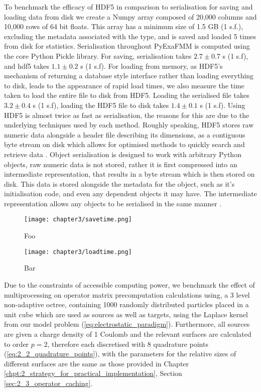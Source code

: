 To benchmark the efficacy of HDF5 in comparison to serialisation for saving
and loading data from disk we create a Numpy array composed of
20,000 columns and 10,000 rows of 64 bit floats. This array has a minimum size
of 1.5 GB (1 s.f.), excluding the metadata associated with the type, and is
saved and loaded 5 times from disk for statistics. Serialisation throughout
\gls{PyExaFMM} is computed using the core Python Pickle library. For saving,
serialisation takes $2.7 \pm 0.7$ s (1 s.f), and hdf5 takes $1.1 \pm 0.2$ s (1 s.f).
For loading from memory, as HDF5's mechanism of returning a database style interface
rather than loading everything to disk, leads to the appearance of rapid
load times, we also measure the time taken to load the entire file to disk from
HDF5. Loading the serialised file takes $3.2 \pm 0.4$ s (1 s.f), loading
the HDF5 file to disk takes $1.4 \pm 0.1$ s (1 s.f). Using HDF5 is almost
twice as fast as serialisation, the reasons for this are due to the underlying
techniques used by each method. Roughly speaking, HDF5 stores raw numeric data
alongside a header file describing its dimensions, as a contiguous byte stream
on disk which allows for optimised methods to quickly search and retrieve data
\cite{collette2013python}. Object serialisation is designed to work with arbitrary
Python objects, raw numeric data is not stored, rather it is first compressed
into an intermediate representation, that results in a byte stream which is then
stored on disk. This data is stored alongside the metadata for the object, such
as it's initialisation code, and even any dependent objects it may have. The
intermediate representation allows any objects to be serialised in the same
manner \cite{pickle}.

\begin{figure}[ht]
    \centering

  {\texttt{[image: chapter3/savetime.png]}}
  \vspace{0pt}
    \caption{
        Foo
    }
    \label{fig:3_1_savetime}
\end{figure}


\begin{figure}[ht]
    \centering

  {\texttt{[image: chapter3/loadtime.png]}}
  \vspace{0pt}
    \caption{
        Bar
    }
    \label{fig:3_1_loadtime}
\end{figure}


Due to the constraints of accessible computing power, we benchmark the effect of
multiprocessing on operator matrix precomputation calculations using, a 3 level
non-adaptive octree, containing 1000 randomly distributed
particles placed in a unit cube which are used as sources as well as targets,
using the Laplace kernel from our model problem (\ref{eq:electrostatic_paradigm}).
Furthermore, all sources are given a charge density of 1 Coulomb and the relevant surfaces
are calculated to order $p=2$, therefore each discretised with $8$ quadrature points
(\ref{eq:2_2_quadrature_points}), with the parameters for the relative sizes
of different surfaces are the same as those provided
in Chapter \ref{chpt:2_strategy_for_practical_implementation},
Section \ref{sec:2_3_operator_caching}.

